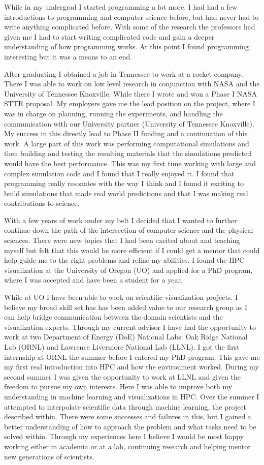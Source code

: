 \documentclass[12pt]{article}
\begin{document}
While in my undergrad I started programming a lot more. I had had a few
introductions to programming and computer science before, but had never had to
write anything complicated before. With some of the research the professors had
given me I had to start writing complicated code and gain a deeper understanding
of how programming works. At this point I found programming interesting but it
was a means to an end. 

After graduating I obtained a job in Tennessee to work at a rocket company.
There I was able to work on low level research in conjunction with NASA and the
University of Tennessee Knoxville. While there I wrote and won a Phase I NASA
STTR proposal. My employers gave me the lead position on the project, where I
was in charge on planning, running the experiments, and handling the
communication with our University partner (University of Tennessee Knoxville).
My success in this directly lead to Phase II funding and a continuation of this
work. A large part of this work was performing computational simulations and
then building and testing the resulting materials that the simulations predicted
would have the best performance. This was my first time working with large and
complex simulation code and I found that I really enjoyed it. I found that
programming really resonates with the way I think and I found it exciting to
build simulations that made real world predictions and that I was making real
contributions to science. 

With a few years of work under my belt I decided that I wanted to further
continue down the path of the intersection of computer science and the physical
sciences. There were new topics that I had been excited about and teaching
myself but felt that this would be more efficient if I could get a mentor that
could help guide me to the right problems and refine my abilities. I found the
HPC visualization at the University of Oregon (UO) and applied for a PhD program,
where I was accepted and have been a student for a year. 

While at UO I have been able to work on scientific visualization projects. I
believe my broad skill set has has been added value to our research group as I
can help bridge communication between the domain scientists and the
visualization experts. Through my current advisor I have had the opportunity to
work at two Department of Energy (DoE) National Labs: Oak Ridge National Lab
(ORNL) and Lawrence Livermore National Lab (LLNL). I got the first internship at
ORNL the summer before I entered my PhD program. This gave me my first real
introduction into HPC and how the environment worked. During my second summer I
was given the opportunity to work at LLNL and given the freedom to pursue my own
interests. Here I was able to improve both my understanding in machine learning
and visualizations in HPC. Over the summer I attempted to interpolate scientific
data through machine learning, the project described within. There were some
successes and failures in this, but I gained a better understanding of how to
approach the problem and what tasks need to be solved within. Through my
experiences here I believe I would be most happy working either in academia or
at a lab, continuing research and helping mentor new generations of scientists. 
\end{document}
